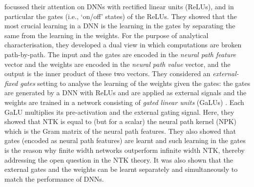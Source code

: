 \cite{npk} focussed their attention on DNNs with rectified linear units (ReLUs), and in particular the gates (i.e., `on/off' states) of the ReLUs. They showed that the most crucial learning in a DNN is the learning in the gates by separating the same from the learning in the weights.  For the purpose of analytical characterisation, they developed a dual view in which computations are broken path-by-path.  The input and the gates are encoded in the  \emph{neural path feature} vector and the weights are encoded in the  \emph{neural path value} vector, and the output is the inner product of these two vectors. They considered an \emph{external-fixed gates} setting to analyse the learning of the weights given the gates:  
 the gates are generated by a DNN with ReLUs and are applied as external signals and the weights are trained in a network consisting of \emph{gated linear units} (GaLUs) \citep{sss}. Each GaLU multiplies its pre-activation and the external gating signal. Here, they showed that NTK is equal to (but for a scalar) the neural path kernel (NPK) which is the Gram matrix of the neural path features. They also showed that gates (encoded as neural path features) are learnt and such learning in the gates is the reason why finite width networks outperform infinite width NTK, thereby addressing the open question in the NTK theory. It was also shown that the external gates and the weights can be learnt separately and simultaneously to match the performance of DNNs.


